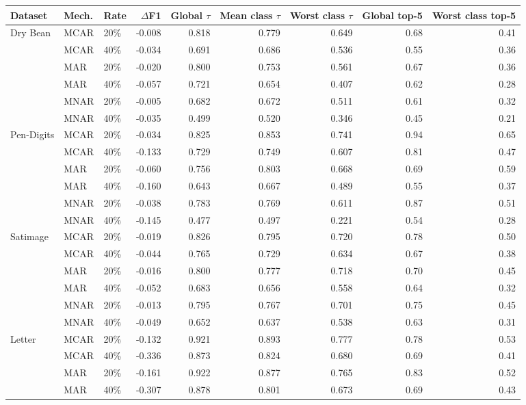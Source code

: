 \begin{tabular}{lllrrrrrr}
\toprule
Dataset & Mech. & Rate & $\Delta$F1 & Global $\tau$ & Mean class $\tau$ & Worst class $\tau$ & Global top-5 & Worst class top-5 \\
\midrule
Dry Bean & MCAR & 20\% & -0.008 & 0.818 & 0.779 & 0.649 & 0.68 & 0.41 \\
 & MCAR & 40\% & -0.034 & 0.691 & 0.686 & 0.536 & 0.55 & 0.36 \\
 & MAR & 20\% & -0.020 & 0.800 & 0.753 & 0.561 & 0.67 & 0.36 \\
 & MAR & 40\% & -0.057 & 0.721 & 0.654 & 0.407 & 0.62 & 0.28 \\
 & MNAR & 20\% & -0.005 & 0.682 & 0.672 & 0.511 & 0.61 & 0.32 \\
 & MNAR & 40\% & -0.035 & 0.499 & 0.520 & 0.346 & 0.45 & 0.21 \\
\midrule
Pen-Digits & MCAR & 20\% & -0.034 & 0.825 & 0.853 & 0.741 & 0.94 & 0.65 \\
 & MCAR & 40\% & -0.133 & 0.729 & 0.749 & 0.607 & 0.81 & 0.47 \\
 & MAR & 20\% & -0.060 & 0.756 & 0.803 & 0.668 & 0.69 & 0.59 \\
 & MAR & 40\% & -0.160 & 0.643 & 0.667 & 0.489 & 0.55 & 0.37 \\
 & MNAR & 20\% & -0.038 & 0.783 & 0.769 & 0.611 & 0.87 & 0.51 \\
 & MNAR & 40\% & -0.145 & 0.477 & 0.497 & 0.221 & 0.54 & 0.28 \\
\midrule
Satimage & MCAR & 20\% & -0.019 & 0.826 & 0.795 & 0.720 & 0.78 & 0.50 \\
 & MCAR & 40\% & -0.044 & 0.765 & 0.729 & 0.634 & 0.67 & 0.38 \\
 & MAR & 20\% & -0.016 & 0.800 & 0.777 & 0.718 & 0.70 & 0.45 \\
 & MAR & 40\% & -0.052 & 0.683 & 0.656 & 0.558 & 0.64 & 0.32 \\
 & MNAR & 20\% & -0.013 & 0.795 & 0.767 & 0.701 & 0.75 & 0.45 \\
 & MNAR & 40\% & -0.049 & 0.652 & 0.637 & 0.538 & 0.63 & 0.31 \\
\midrule
Letter & MCAR & 20\% & -0.132 & 0.921 & 0.893 & 0.777 & 0.78 & 0.53 \\
 & MCAR & 40\% & -0.336 & 0.873 & 0.824 & 0.680 & 0.69 & 0.41 \\
 & MAR & 20\% & -0.161 & 0.922 & 0.877 & 0.765 & 0.83 & 0.52 \\
 & MAR & 40\% & -0.307 & 0.878 & 0.801 & 0.673 & 0.69 & 0.43 \\

\end{tabular}

